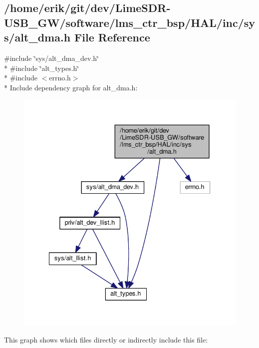 \subsection{/home/erik/git/dev/\+Lime\+S\+D\+R-\/\+U\+S\+B\+\_\+\+G\+W/software/lms\+\_\+ctr\+\_\+bsp/\+H\+A\+L/inc/sys/alt\+\_\+dma.h File Reference}
\label{alt__dma_8h}
{\ttfamily \#include \char`\"{}sys/alt\+\_\+dma\+\_\+dev.\+h\char`\"{}}\\*
{\ttfamily \#include \char`\"{}alt\+\_\+types.\+h\char`\"{}}\\*
{\ttfamily \#include $<$errno.\+h$>$}\\*
Include dependency graph for alt\+\_\+dma.\+h\+:
\nopagebreak
\begin{figure}[H]
\begin{center}
\leavevmode
\includegraphics[width=334pt]{dd/de3/alt__dma_8h__incl}
\end{center}
\end{figure}
This graph shows which files directly or indirectly include this file\+:
\nopagebreak
